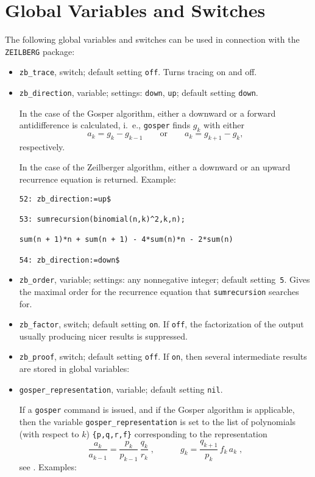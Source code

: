 \section{Global Variables and Switches}
The following global variables and switches can be used in connection with
the {\tt ZEILBERG} package:
\begin{itemize}
\item
{\tt zb\verb+_+trace}, switch; default setting {\tt off}.
Turns tracing on and off.
\item
{\tt zb\verb+_+direction}, variable; settings: {\tt down}, {\tt up};
default setting {\tt down}.

In the case of the Gosper algorithm, either a downward or a forward
antidifference is calculated, i.\ e., {\tt gosper} finds $g_k$ with either
\[
a_k=g_k-g_{k-1}
\quad\quad\mbox{or}\quad\quad
a_k=g_{k+1}-g_{k},
\]
respectively.

In the case of the Zeilberger algorithm, either a downward or an upward
recurrence equation is returned. Example:

{\small
\begin{verbatim}
52: zb_direction:=up$

53: sumrecursion(binomial(n,k)^2,k,n);

sum(n + 1)*n + sum(n + 1) - 4*sum(n)*n - 2*sum(n)

54: zb_direction:=down$
\end{verbatim}
}\noindent
\item
{\tt zb\verb+_+order}, variable; settings: any nonnegative integer;
default setting~{\tt 5}.
Gives the maximal order for the recurrence
equation that {\tt sumrecursion} searches for.
\item
{\tt zb\verb+_+factor}, switch; default setting {\tt on}.
If {\tt off}, the factorization of the output usually producing nicer results
is suppressed.
\item
{\tt zb\verb+_+proof}, switch; default setting {\tt off}. If {\tt on},
then several intermediate results are stored in global variables:
\item
{\tt gosper\verb+_+representation}, variable; default setting {\tt nil}.

If a {\tt gosper} command is issued, and if the Gosper algorithm is applicable,
then the variable {\tt gosper\verb+_+representation} is set to the
list of polynomials (with respect to $k$) {\tt \{p,q,r,f\}}
corresponding to the representation
\[
\frac{a_k}{a_{k-1}}=\frac{p_k}{p_{k-1}}\,\frac{q_k}{r_k}
\;,
\quad\quad\quad
g_k=\frac{q_{k+1}}{p_k}\,f_k\,a_k
\;,
\]
see \cite{Gos}. Examples:


\end{itemize}
